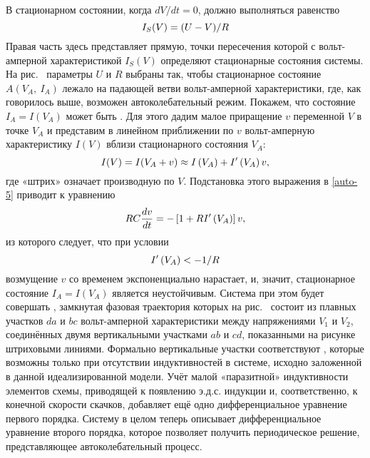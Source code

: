 В стационарном состоянии, когда $dV / dt = 0$, должно выполняться равенство
\begin{equation}
	\eqmark{auto-6}
	I_S(V)=(U-V)/R 
\end{equation}
Правая часть здесь представляет  прямую, точки пересечения которой с вольт-амперной характеристикой ${{I}_{S}}\left( V \right)$ определяют стационарные состояния системы. На рис.~ параметры $U$ и $R$ выбраны так, чтобы стационарное состояние $A(V_A,~I_A)$ лежало на падающей ветви вольт-амперной характеристики, где, как говорилось выше, возможен
автоколебательный режим. Покажем, что состояние $I_A=I(V_A)$ может быть . Для этого дадим малое приращение $v$ переменной $V$ в точке
$V_A$ и представим в линейном приближении по $v$ вольт-амперную характеристику $I(V)$ вблизи стационарного состояния $V_A$:
\begin{equation} 
	\eqmark{auto-7}
	I(V)=I(V_A + v)\approx I\left( V_A \right)+{I}'\left( V_A \right)v, 
\end{equation}
где «штрих» означает производную по $V$. Подстановка этого выражения в \eqref{auto-5} приводит к уравнению
\begin{equation} 
	\eqmark{auto-8}
	RC\frac{dv}{dt}=-\left[ 1+R{I}'\left( V_A \right) \right]v, 
\end{equation}
из которого следует, что при условии
\begin{equation} 
	\eqmark{auto-9}
	I'\left( V_A \right) <- {1}/{R}
\end{equation}
возмущение $v$ со временем экспоненциально нарастает, и, значит, стационарное состояние $I_A=I(V_A)$ является неустойчивым. Система при этом будет совершать , замкнутая фазовая траектория которых на рис.~ состоит из плавных участков $da$ и $bc$ вольт-амперной характеристики между напряжениями $V_1$ и $V_2$, соединённых двумя вертикальными участками $ab$ и $cd$, показанными на рисунке штриховыми линиями. Формально вертикальные участки соответствуют , которые возможны только при отсутствии индуктивностей в системе, исходно заложенной в данной идеализированной модели. Учёт малой «паразитной» индуктивности элементов схемы, приводящей к появлению э.д.с. индукции и, соответственно, к конечной скорости скачков, добавляет ещё одно дифференциальное уравнение первого порядка. Систему в целом теперь описывает дифференциальное уравнение второго порядка, которое позволяет получить периодическое решение, представляющее автоколебательный процесс.